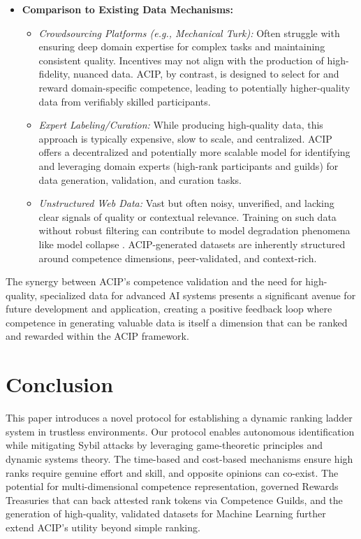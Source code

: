 \documentclass{article}
\begin{document}
\begin{CJK}{UTF8}{gbsn}
\begin{itemize}
            \item \textbf{Comparison to Existing Data Mechanisms:}
                  \begin{itemize}[label=\textbullet, leftmargin=*]
                      \item \textit{Crowdsourcing Platforms (e.g., Mechanical Turk):} Often struggle with ensuring deep domain expertise for complex tasks and maintaining consistent quality. Incentives may not align with the production of high-fidelity, nuanced data. ACIP, by contrast, is designed to select for and reward domain-specific competence, leading to potentially higher-quality data from verifiably skilled participants.
                      \item \textit{Expert Labeling/Curation:} While producing high-quality data, this approach is typically expensive, slow to scale, and centralized. ACIP offers a decentralized and potentially more scalable model for identifying and leveraging domain experts (high-rank participants and guilds) for data generation, validation, and curation tasks.
                      \item \textit{Unstructured Web Data:} Vast but often noisy, unverified, and lacking clear signals of quality or contextual relevance. {{Training on such data without robust filtering can contribute to model degradation phenomena like model collapse \cite{dohmatob2024strongmodelcollapse}.}} ACIP-generated datasets are inherently structured around competence dimensions, peer-validated, and context-rich.
                  \end{itemize}
        \end{itemize}
        The synergy between ACIP's competence validation and the need for high-quality, specialized data for advanced AI systems presents a significant avenue for future development and application, creating a positive feedback loop where competence in generating valuable data is itself a dimension that can be ranked and rewarded within the ACIP framework.

        \section{Conclusion}
        This paper introduces a novel protocol for establishing a dynamic ranking ladder system in trustless environments. Our protocol enables autonomous identification while mitigating Sybil attacks by leveraging game-theoretic principles and dynamic systems theory. The time-based and cost-based mechanisms ensure high ranks require genuine effort and skill, and opposite opinions can co-exist. {{The potential for multi-dimensional competence representation, governed Rewards Treasuries that can back attested rank tokens via Competence Guilds, and the generation of high-quality, validated datasets for Machine Learning further extend ACIP's utility beyond simple ranking.}}


\end{CJK}
\end{document}
